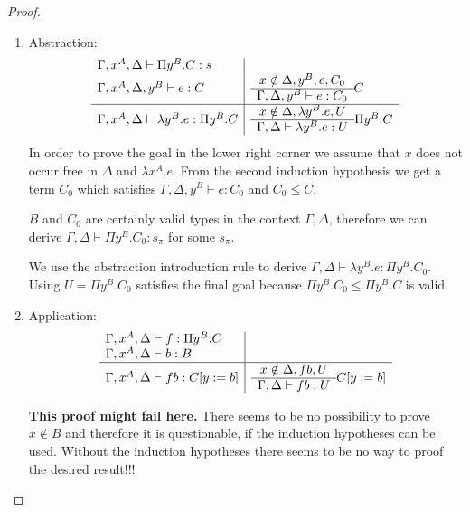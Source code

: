 \begin{lemma}
\begin{proof}
{\begin{enumerate}
\begin{enumerate}
                \item Abstraction:
                $$
                \begin{array}{l|l}
                    \Gamma,x^A,\Delta \vdash \Pi y^B.C : s
                    \\
                    \Gamma,x^A,\Delta,y^B \vdash e: C
                    &
                    \begin{array}{c}  x \notin \Delta,y^B, e, C_0  \\ \hline  \Gamma,\Delta,y^B \vdash e : C_0 \end{array} C
                    \\
                    \hline
                    \Gamma,x^A,\Delta \vdash \lambda y^B. e: \Pi y^B.C
                    &
                    \begin{array}{c}  x \notin \Delta, \lambda y^B. e, U  \\ \hline  \Gamma,\Delta \vdash \lambda y^B. e : U \end{array} {\Pi y^B.C}
                \end{array}
                $$
                In order to prove the goal in the lower right corner we assume
                that $x$ does not occur free in $\Delta$ and $\lambda x^A.e$.
                From the second induction hypothesis we get a term $C_0$ which
                satisfies $\Gamma,\Delta,y^B \vdash e: C_0$ and $C_0 \le C$.

                $B$ and $C_0$ are certainly valid types in the context
                $\Gamma,\Delta$, therefore we can derive $\Gamma,\Delta \vdash
                \Pi y^B.C_0 : s_\pi$ for some $s_\pi$.

                We use the abstraction introduction rule to derive
                $\Gamma,\Delta \vdash \lambda y^B. e: \Pi y^B. C_0$. Using $U =
                \Pi y^B. C_0$ satisfies the final goal because $\Pi y^B. C_0 \le
                \Pi y^B. C$ is valid.

                \item Application:
                $$
                \begin{array}{l|l}
                    \Gamma,x^A,\Delta \vdash f: \Pi y^B.C
                    &
                    \\
                    \Gamma,x^A,\Delta  \vdash b : B
                    &
                    \\
                    \hline
                    \Gamma,x^A,\Delta \vdash f b : C[y:=b]
                    &
                    \begin{array}{c}  x \notin \Delta, f b, U  \\ \hline  \Gamma,\Delta \vdash f b : U \end{array} {C[y:=b]}
                \end{array}
                $$

                {\bf This proof might fail here.} There seems to be no
                possibility to prove $x \notin B$ and therefore it is
                questionable, if the induction hypotheses can be used. Without
                the induction hypotheses there seems to be no way to proof the
                desired result!!!



\end{enumerate}
\end{enumerate}}
\end{proof}
\end{lemma}
